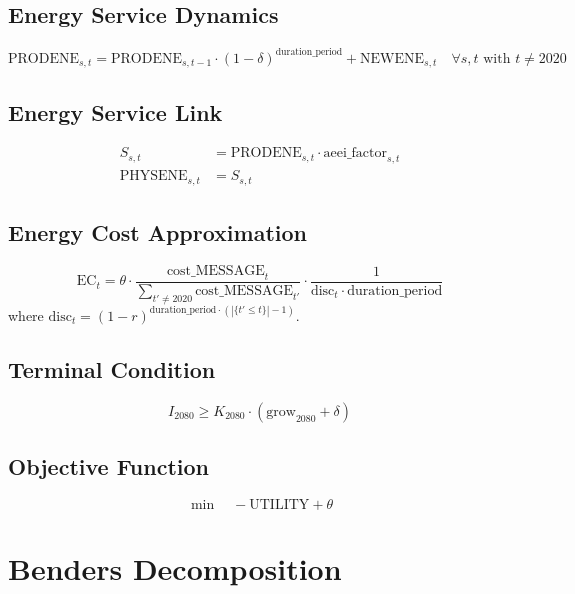 \documentclass[11pt]{article}
\begin{document}
\subsection{Energy Service Dynamics}
\begin{equation}
\text{PRODENE}_{s,t} = \text{PRODENE}_{s,t-1} \cdot (1-\delta)^{\text{duration\_period}} + \text{NEWENE}_{s,t} \quad \forall s,t \text{ with } t \neq 2020
\end{equation}

\subsection{Energy Service Link}
\begin{align}
S_{s,t} &= \text{PRODENE}_{s,t} \cdot \text{aeei\_factor}_{s,t} \\
\text{PHYSENE}_{s,t} &= S_{s,t}
\end{align}

\subsection{Energy Cost Approximation}
\begin{equation}
\text{EC}_t = \theta \cdot \frac{\text{cost\_MESSAGE}_t}{\sum_{t' \neq 2020} \text{cost\_MESSAGE}_{t'}} \cdot \frac{1}{\text{disc}_t \cdot \text{duration\_period}}
\end{equation}
where $\text{disc}_t = (1-r)^{\text{duration\_period} \cdot (|\{t' \leq t\}| - 1)}$.

\subsection{Terminal Condition}
\begin{equation}
I_{2080} \geq K_{2080} \cdot (\text{grow}_{2080} + \delta)
\end{equation}

\subsection{Objective Function}
\begin{equation}
\min \quad -\text{UTILITY} + \theta
\end{equation}

\section{Benders Decomposition}
\end{document}
